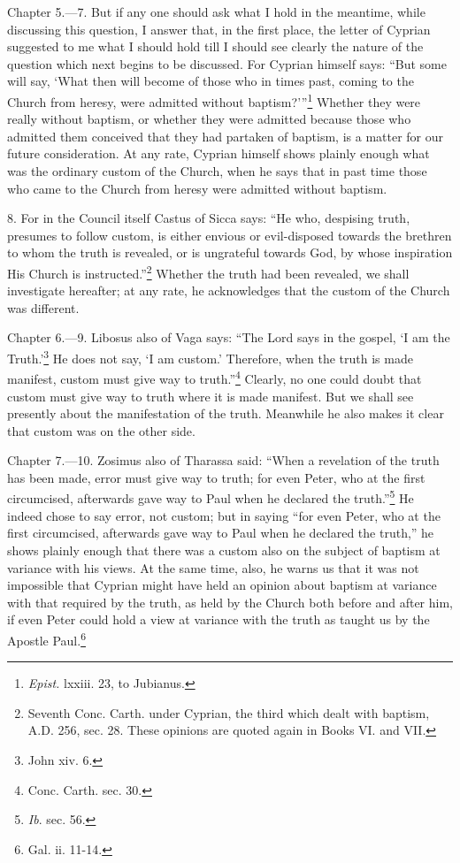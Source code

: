 Chapter 5.—7. But if any one should ask what I hold in the meantime, while discussing this question, I answer that, in the first place, the letter of Cyprian suggested to me what I should hold till I should see clearly the nature of the question which next begins to be discussed. For Cyprian himself says: ``But some will say, ‘What then will become of those who in times past, coming to the Church from heresy, were admitted without baptism?’''\footnote{\par  \emph{Epist.} lxxiii. 23, to Jubianus.} Whether they were really without baptism, or whether they were admitted because those who admitted them conceived that they had partaken of baptism, is a matter for our future consideration. At any rate, Cyprian himself shows plainly enough what was the ordinary custom of the Church, when he says that in past time those who came to the Church from heresy were admitted without baptism.

8. For in the Council itself Castus of Sicca says: ``He who, despising truth, presumes to follow custom, is either envious or evil-disposed towards the brethren to whom the truth is revealed, or is ungrateful towards God, by whose inspiration His Church is instructed.''\footnote{\par  Seventh Conc. Carth. under Cyprian, the third which dealt with baptism, A.D. 256, sec. 28. These opinions are quoted again in Books VI. and VII.} Whether the truth had been revealed, we shall investigate hereafter; at any rate, he acknowledges that the custom of the Church was different.


Chapter 6.—9. Libosus also of Vaga says: ``The Lord says in the gospel, ‘I am the Truth.’\footnote{\par  John xiv. 6.} He does not say, ‘I am custom.’ Therefore, when the truth is made manifest, custom must give way to truth.''\footnote{\par  Conc. Carth. sec. 30.} Clearly, no one could doubt that custom must give way to truth where it is made manifest. But we shall see presently about the manifestation of the truth. Meanwhile he also makes it clear that custom was on the other side.


Chapter 7.—10. Zosimus also of Tharassa said: ``When a revelation of the truth has been made, error must give way to truth; for even Peter, who at the first circumcised, afterwards gave way to Paul when he declared the truth.''\footnote{\par  \emph{Ib}. sec. 56.} He indeed chose to say error, not custom; but in saying ``for even Peter, who at the first circumcised, afterwards gave way to Paul when he declared the truth,'' he shows plainly enough that there was a custom also on the subject of baptism at variance with his views. At the same time, also, he warns us that it was not impossible that Cyprian might have held an opinion about baptism at variance with that required by the truth, as held by the Church both before and after him, if even Peter could hold a view at variance with the truth as taught us by the Apostle Paul.\footnote{\par  Gal. ii. 11-14.}

